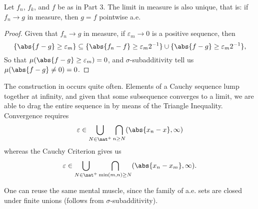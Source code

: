 \documentclass[../../main.tex]{subfiles}
\begin{document}
\begin{wts}
    Let $f_n$, $f_k$, and $f$ be as in Part 3. The limit in measure is also unique, that is: if $f_n\to g$ in measure, then $g = f$ pointwise a.e.
\end{wts}
\begin{proof}
    Given that $f_n\to g$ in measure, if $\varepsilon_m\to 0$ is a positive sequence, then
    \[
        \{\abs{f-g}\geq \varepsilon_m\}\subseteq \{\abs{f_n - f} \geq \varepsilon_m2^{-1}\}\cup\{\abs{f - g}\geq\varepsilon_m2^{-1}\},
    \]
    So that $\mu(\abs{f-g}\geq\varepsilon_m)=0$, and $\sigma$-subadditivity tell us $\mu(\abs{f-g}\neq 0)=0$.
\end{proof}
\begin{remark}[Cauchy + Pointwise = Pointwise: Part 1]
    The construction in  occurs quite often. Elements of a Cauchy sequence lump together at infinity, and given that some subsequence converges to a limit, we are able to drag the entire sequence in by means of the Triangle Inequality. Convergence requires
    \[
        \varepsilon\in \bigcup_{N\in\nat^+}\bigcap_{n\geq N}(\abs{x_n - x},\infty)
    \]
    whereas the Cauchy Criterion gives us 
    \[
        \varepsilon\in\bigcup_{N\in\nat^+}\bigcap_{\min(m,n)\geq N}(\abs{x_n - x_m}, \infty).
    \]
\end{remark}
\begin{remark}
    One can reuse the same mental muscle, since the family of a.e. sets are closed under finite unions (follows from $\sigma$-subadditivity).
\end{remark}
\end{document}
